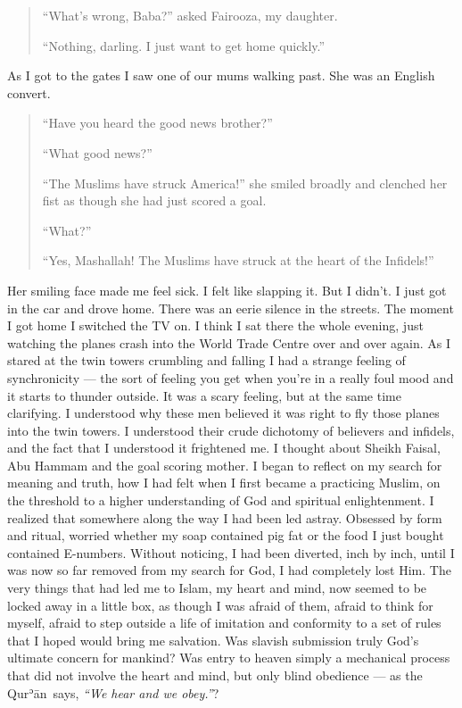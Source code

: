 \documentclass[12pt]{memoir}
\def\´{ʾ} %
\newcommand{\cor}[2]{#2} %
\def \Quran{Qur\-\´ān} %
\def\–{-\hskip0pt}
\begin{document}
\begin{quote}
“What’s wrong, Baba?” asked Fairooza, my daughter.

“Nothing, darling.
I just want to get home quickly.”
\end{quote}

As I got to the gates I saw one of our mums walking past.
She was an English convert.

\begin{quote}
“Have you heard the good news brother?”

“What good news?”

“The Muslims have struck America!” she smiled broadly
and clenched her fist as though she had just scored a goal.

“What?”

“Yes, Mashallah! The Muslims have struck at the heart of the Infidels!”
\end{quote}

Her smiling face made me feel sick.
I felt like slapping it.
But I didn’t.
I just got in the car and drove home.
There was an eerie silence in the streets.
The moment I got home I switched the TV on.
I think I sat there the whole evening, just watching the planes
crash into the World Trade Centre over and over again.
As I stared at the twin towers crumbling and falling
I had a strange feeling of synchronicity —
the sort of feeling you get when you’re in a really foul mood
and it starts to thunder outside.
It was a scary feeling, but at the same time clarifying.
I understood why these men believed it was right
to fly those planes into the twin towers.
I understood their crude dichotomy of believers and infidels,
and the fact that I understood it frightened me.
I thought about Sheikh \cor{Fadil}{Faisal},
Abu Hammam and the goal scoring mother.
I began to reflect on my search for meaning and truth,
how I had felt when I first became a practicing Muslim,
on the threshold to a higher understanding of God and spiritual enlightenment.
I realized that somewhere along the way I had been led astray.
Obsessed by form and ritual, worried whether my soap contained pig fat
or the food I just bought contained E\–numbers.
Without noticing, I had been diverted, inch by inch,
until I was now so far removed from my search for God,
I had completely lost Him.
The very things that had led me to Islam, my heart and mind,
now seemed to be locked away in a little box, as though I was afraid of them,
afraid to think for myself, afraid to step outside a life of imitation
and conformity to a set of rules that I hoped would bring me salvation.
Was slavish submission truly God’s ultimate concern for mankind?
Was entry to heaven simply a mechanical process
that did not involve the heart and mind,
but only blind obedience — as the \Quran\ says,
\emph{“We hear and we obey.”}?
\end{document}
